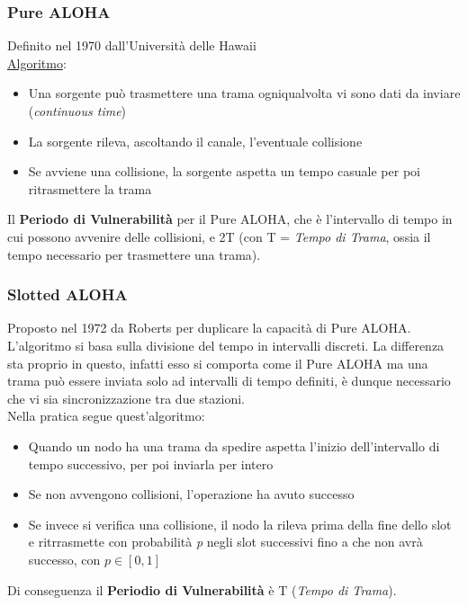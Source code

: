 \documentclass{article}
\begin{document}
            \subsubsection{Pure ALOHA}
                Definito nel 1970 dall'Università delle Hawaii \\
                \underline{Algoritmo}:
                \begin{itemize}
                    \item Una sorgente può trasmettere una trama ogniqualvolta vi sono dati da inviare (\textit{continuous time})
                    \item La sorgente rileva, ascoltando il canale, l'eventuale collisione
                    \item Se avviene una collisione, la sorgente aspetta un tempo casuale per poi ritrasmettere la trama
                \end{itemize}
                Il \textbf{Periodo di Vulnerabilità} per il Pure ALOHA, che è l'intervallo di tempo in cui possono avvenire delle collisioni, e 2T (con T = \textit{Tempo di Trama}, ossia il tempo necessario per trasmettere una trama).

            \subsubsection{Slotted ALOHA}
                Proposto nel 1972 da Roberts per duplicare la capacità di Pure ALOHA.\\
                L'algoritmo si basa sulla divisione del tempo in intervalli discreti. La differenza sta proprio in questo, infatti esso si comporta come il Pure ALOHA ma una trama può essere inviata solo ad intervalli di tempo definiti, è dunque necessario che vi sia sincronizzazione tra due stazioni.\\
                Nella pratica segue quest'algoritmo:
                \begin{itemize}
                    \item Quando un nodo ha una trama da spedire aspetta l'inizio dell'intervallo di tempo successivo, per poi inviarla per intero
                    \item Se non avvengono collisioni, l'operazione ha avuto successo
                    \item Se invece si verifica una collisione, il nodo la rileva prima della fine dello slot e ritrrasmette con probabilità \textit{p} negli slot successivi fino a che non avrà successo, con $ p \in [0,1] $
                \end{itemize}
                Di conseguenza il \textbf{Periodio di Vulnerabilità} è T (\textit{Tempo di Trama}).
\end{document}
